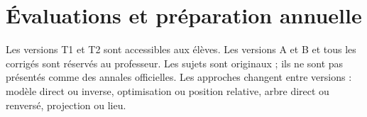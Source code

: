 \chapter{Évaluations et préparation annuelle}\label{EVAL}
Les versions T1 et T2 sont accessibles aux élèves. Les versions A et B et tous les corrigés sont réservés au professeur. Les sujets sont originaux ; ils ne sont pas présentés comme des annales officielles. Les approches changent entre versions : modèle direct ou inverse, optimisation ou position relative, arbre direct ou renversé, projection ou lieu.

\ifprof\fi

\ifprof\fi
\ifprof

\ifprof\fi
\fi
\ifprof

\ifprof\fi
\fi

\ifprof\fi

\ifprof\fi
\ifprof

\ifprof\fi
\fi
\ifprof

\ifprof\fi
\fi

\ifprof\fi

\ifprof\fi
\ifprof

\ifprof\fi
\fi
\ifprof

\ifprof\fi
\fi

\ifprof\fi

\ifprof\fi
\ifprof

\ifprof\fi
\fi
\ifprof

\ifprof\fi
\fi
